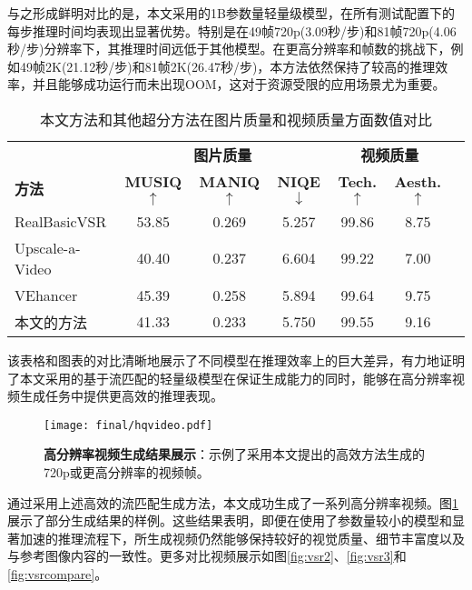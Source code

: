 与之形成鲜明对比的是，本文采用的1B参数量轻量级模型，在所有测试配置下的每步推理时间均表现出显著优势。特别是在49帧720p(3.09秒/步)和81帧720p(4.06秒/步)分辨率下，其推理时间远低于其他模型。在更高分辨率和帧数的挑战下，例如49帧2K(21.12秒/步)和81帧2K(26.47秒/步)，本方法依然保持了较高的推理效率，并且能够成功运行而未出现OOM，这对于资源受限的应用场景尤为重要。
\begin{table}[!t]
\centering
\caption{本文方法和其他超分方法在图片质量和视频质量方面数值对比}
\small
\begin{tabular}{lcccccc}
\toprule
& \multicolumn{3}{c}{\textbf{图片质量}} & \multicolumn{2}{c}{\textbf{视频质量 \cite{dover}}} \\
\cmidrule(lr){2-4} \cmidrule(lr){5-6} 
\textbf{方法} & \textbf{MUSIQ\cite{ke2021musiq}$\uparrow$} & 
\textbf{MANIQ\cite{maniqa}$\uparrow$} &
\textbf{NIQE\cite{niqe}$\downarrow$} &  
\textbf{Tech.$\uparrow$} & \textbf{Aesth.$\uparrow$} \\
\midrule
RealBasicVSR\cite{RealBasicVSR} &53.85 &0.269&5.257 &99.86& 8.75 \\
Upscale-a-Video\cite{zhou2024upscaleavideo}&40.40 &0.237 &6.604 & 99.22& 7.00\\
VEhancer\cite{he2024venhancer}&45.39 &0.258 &5.894&99.64&9.75\\
\bottomrule
本文的方法&41.33 &0.233 & 5.750&99.55&9.16 \\
\end{tabular}
\label{tab:vsr_compare}
\end{table}
该表格和图表的对比清晰地展示了不同模型在推理效率上的巨大差异，有力地证明了本文采用的基于流匹配的轻量级模型在保证生成能力的同时，能够在高分辨率视频生成任务中提供更高效的推理表现。
\begin{figure}[h]
    \centering
    \texttt{[image: final/hqvideo.pdf]}
    \caption{\textbf{高分辨率视频生成结果展示}：示例了采用本文提出的高效方法生成的720p或更高分辨率的视频帧。}
    \label{hqvideo}
\end{figure}
通过采用上述高效的流匹配生成方法，本文成功生成了一系列高分辨率视频。图\ref{hqvideo}展示了部分生成结果的样例。这些结果表明，即便在使用了参数量较小的模型和显著加速的推理流程下，所生成视频仍然能够保持较好的视觉质量、细节丰富度以及与参考图像内容的一致性。更多对比视频展示如图\ref{fig:vsr2}、\ref{fig:vsr3}和\ref{fig:vsrcompare}。

